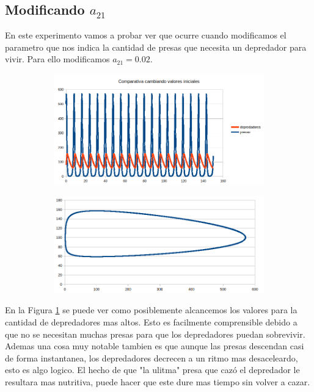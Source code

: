 \documentclass[12pt,a4paper]{article}
\begin{document}
\subsection{Modificando $a_{21}$}
En este experimento vamos a probar ver que ocurre cuando modificamos el parametro que nos indica la cantidad de presas que necesita un depredador para vivir. Para ello modificamos $a_{21}=0.02$. 
\begin{figure}[H]
	\centering
	\begin{subfigure}{.5\textwidth}
		\centering
	\includegraphics[width=1\linewidth]{images/ejercicio4_3_1}
		\caption{}
	\label{fig:ejercicio431}
	\end{subfigure}%
	\begin{subfigure}{.5\textwidth}
		\centering
	\includegraphics[width=1\linewidth]{images/ejercicio4_3_2}
		\caption{}
	\label{fig:ejercicio432}
	\end{subfigure}
	
	\label{fig:ejercicio423}
\end{figure}
En la Figura \ref{fig:ejercicio431} se puede ver como posiblemente alcancemos los valores para la cantidad de depredadores mas altos. Esto es facilmente comprensible debido a que no se necesitan muchas presas para que los depredadores puedan sobrevivir. Ademas una cosa muy notable tambien es que aunque las presas descendan casi de forma instantanea, los depredadores decrecen a un ritmo mas desaceleardo, esto es algo logico. El hecho de que "la ulitma" presa que cazó el depredador le resultara mas nutritiva, puede hacer que este dure mas tiempo sin volver a cazar. 
\end{document}
